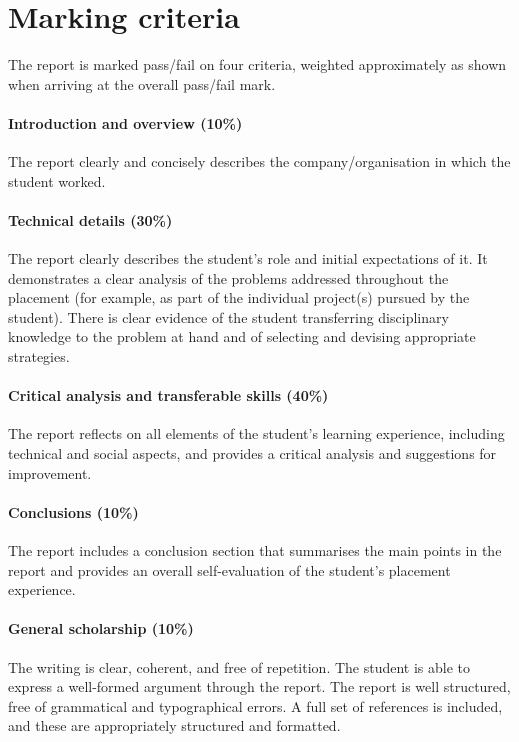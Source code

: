 \documentclass[12pt,a4paper,twoside,openright]{report}
\begin{document}
\section{Marking criteria}

The report is marked pass/fail on four criteria,
weighted approximately as shown when arriving at the overall pass/fail mark.

\paragraph{Introduction and overview (10\%)}
The report clearly and concisely describes the company/organisation in which the student worked.

\paragraph{Technical details (30\%)}
The report clearly describes the student's role and initial expectations of it.
It demonstrates a clear analysis of the problems addressed throughout the placement
(for example, as part of the individual project(s) pursued by the student).
There is clear evidence of the student transferring disciplinary knowledge
to the problem at hand and of selecting and devising appropriate strategies.

\paragraph{Critical analysis and transferable skills (40\%)}
The report reflects on all elements of the student's learning experience,
including technical and social aspects, and provides a critical analysis and suggestions
for improvement.

\paragraph{Conclusions (10\%)}
The report includes a conclusion section that
summarises the main points in the report
and provides an overall self-evaluation of the student's placement experience.

\paragraph{General scholarship (10\%)}
The writing is clear, coherent, and free of repetition.
The student is able to express a well-formed argument through the report.
The report is well structured, free of grammatical and typographical errors.
A full set of references is included, and these are appropriately structured and formatted.



\end{document}
